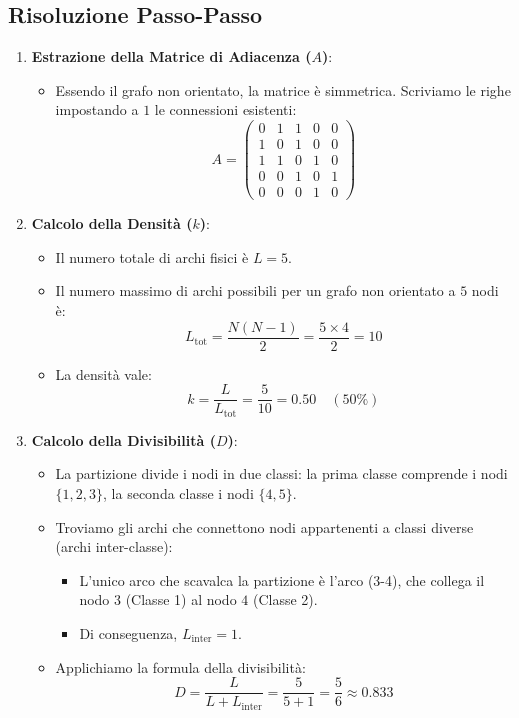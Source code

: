 \documentclass[10pt, letterpaper]{report}
\begin{document}
\subsection*{Risoluzione Passo-Passo}
\begin{enumerate}
    \item \textbf{Estrazione della Matrice di Adiacenza ($A$)}:
    \begin{itemize}
        \item Essendo il grafo non orientato, la matrice è simmetrica. Scriviamo le righe impostando a $1$ le connessioni esistenti:
        \[
        A = \begin{pmatrix}
        0 & 1 & 1 & 0 & 0 \\
        1 & 0 & 1 & 0 & 0 \\
        1 & 1 & 0 & 1 & 0 \\
        0 & 0 & 1 & 0 & 1 \\
        0 & 0 & 0 & 1 & 0
        \end{pmatrix}
        \]
    \end{itemize}
    \item \textbf{Calcolo della Densità ($k$)}:
    \begin{itemize}
        \item Il numero totale di archi fisici è $L = 5$.
        \item Il numero massimo di archi possibili per un grafo non orientato a $5$ nodi è:
        \[
        L_{\text{tot}} = \frac{N(N-1)}{2} = \frac{5 \times 4}{2} = 10
        \]
        \item La densità vale:
        \[
        k = \frac{L}{L_{\text{tot}}} = \frac{5}{10} = 0.50 \quad (50\%)
        \]
    \end{itemize}
    \item \textbf{Calcolo della Divisibilità ($D$)}:
    \begin{itemize}
        \item La partizione divide i nodi in due classi: la prima classe comprende i nodi $\{1, 2, 3\}$, la seconda classe i nodi $\{4, 5\}$.
        \item Troviamo gli archi che connettono nodi appartenenti a classi diverse (archi inter-classe):
        \begin{itemize}
            \item L'unico arco che scavalca la partizione è l'arco (3-4), che collega il nodo $3$ (Classe 1) al nodo $4$ (Classe 2).
            \item Di conseguenza, $L_{\text{inter}} = 1$.
        \end{itemize}
        \item Applichiamo la formula della divisibilità:
        \[
        D = \frac{L}{L + L_{\text{inter}}} = \frac{5}{5 + 1} = \frac{5}{6} \approx 0.833
        \]
    \end{itemize}
\end{enumerate}
\end{document}
